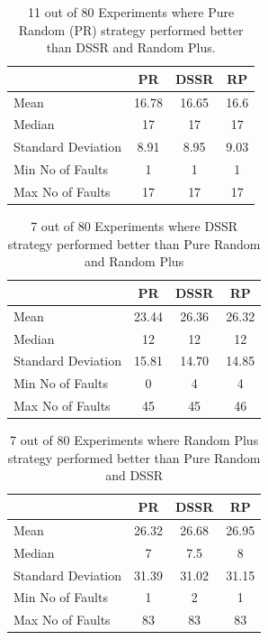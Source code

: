 \documentclass[conference]{IEEEtran}
\begin{document}
\begin{table}[H]
\caption{11 out of 80 Experiments where Pure Random (PR) strategy performed better than DSSR and Random Plus.}
\centering
\begin{tabular}{|l|c|c|c|}
\hline\hline
 				& PR			&  DSSR 			& RP \\[1ex]
\hline
Mean  			&    16.78		&  16.65			&  16.6\\
Median 			&    17    		&  17				&  17 \\
Standard Deviation 	&    8.91		&  8.95			&  9.03\\
Min No of Faults	&    1			&  1				&  1\\
Max No of Faults 	&    17		&  17				& 17\\
\hline
\end{tabular}
\label{table:result1}
\end{table}



\begin{table}[H]
\caption{7 out of 80 Experiments where DSSR strategy performed better than Pure Random and Random Plus}
\centering
\begin{tabular}{|l|c|c|c|}
\hline\hline
 				& PR			&  DSSR 			& RP \\[1ex]
\hline
Mean  			&    23.44		&  26.36			&  26.32\\
Median 			&    12 		&  12 			&  12 \\
Standard Deviation 	&    15.81		&  14.70			&  14.85\\
Min No of Faults	&    0			&  4				&  4\\
Max No of Faults 	&    45		&  45				&  46\\
\hline
\end{tabular}
\label{table:result2}
\end{table}


\begin{table}[H]
\caption{7 out of 80 Experiments where Random Plus strategy performed better than Pure Random and DSSR}
\centering
\begin{tabular}{|l|c|c|c|}
\hline\hline
 				& PR			&  DSSR 			& RP \\[1ex]
\hline
Mean  			&    26.32		&  26.68			&  26.95\\
Median 			&    7 		&  7.5 			&  8 \\
Standard Deviation 	&    31.39		&  31.02			&  31.15\\
Min No of Faults	&    1			&  2				&  1\\
Max No of Faults 	&    83		&  83				&  83\\
\hline
\end{tabular}
\label{table:result3}
\end{table}
\end{document}
